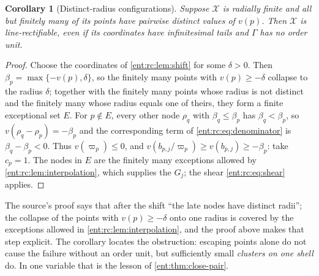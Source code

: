 \documentclass[11pt]{article}
\theoremstyle{plain}
\theoremstyle{plain}
\theoremstyle{plain}
\newtheorem{corollary}[corollary]{Corollary}
\theoremstyle{definition}
\theoremstyle{definition}
\theoremstyle{definition}
\theoremstyle{definition}
\theoremstyle{remark}
\begin{document}
\begin{corollary}[Distinct-radius configurations]
\label{ent:rc:cor:distinct-radii}
Suppose $\mathcal X$ is radially finite and all but finitely many of its
points have pairwise distinct values of $v(p)$. Then $\mathcal X$ is
line-rectifiable, even if its coordinates have infinitesimal tails and
$\Gamma$ has no order unit.
\end{corollary}
\begin{proof}
Choose the coordinates of \cref{ent:rc:lem:shift} for some $\delta>0$. Then
$\beta_p=\max\{-v(p),\delta\}$, so the finitely many points with
$v(p)\ge-\delta$ collapse to the radius $\delta$; together with the finitely
many points whose radius is not distinct and the finitely many whose radius
equals one of theirs, they form a finite exceptional set $E$. For
$p\notin E$, every other node $\rho_q$ with $\beta_q\le\beta_p$ has
$\beta_q<\beta_p$, so $v(\rho_q-\rho_p)=-\beta_p$ and the corresponding term of
\eqref{ent:rc:eq:denominator} is $\beta_q-\beta_p<0$. Thus
$v(\varpi_p)\le0$, and $v(b_{p,j}/\varpi_p)\ge v(b_{p,j})\ge-\beta_p$: take
$c_p=1$. The nodes in $E$ are the finitely many exceptions allowed by
\cref{ent:rc:lem:interpolation}, which supplies the $G_j$; the shear
\eqref{ent:rc:eq:shear} applies.
\end{proof}

The source's proof says that after the shift ``the late nodes have distinct
radii''; the collapse of the points with $v(p)\ge-\delta$ onto one radius is
covered by the exceptions allowed in \cref{ent:rc:lem:interpolation}, and the
proof above makes that step explicit. The corollary locates the obstruction:
escaping points alone do not cause the failure without an order unit, but
sufficiently small \emph{clusters on one shell} do. In one variable that is
the lesson of \cref{ent:thm:close-pair}.
\end{document}
